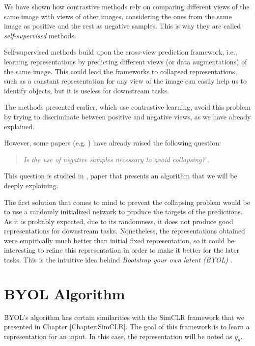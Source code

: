 \label{Chapter:BYOL}


We have shown how contrastive methods rely on comparing different views of the same image with views of other images, considering the ones from the same image as positive and the rest as negative samples. This is why they are called \emph{self-supervised} methods.

Self-supervised methods build upon the cross-view prediction framework, i.e., learning representations by predicting different views (or data augmentations) of the same image. This could lead the frameworks to collapsed representations, such as a constant representation for any view of the image can easily help us to identify objects, but it is useless for downstream tasks.

The methods presented earlier, which use contrastive learning, avoid this problem by trying to discriminate between positive and negative views, as we have already explained.

However, some papers (e.g. \cite{caron2019deep}) have already raised the following question:

\begin{quote}
    \centering
\emph{ Is the use of negative samples necessary to avoid collapsing? }. 
\end{quote}
This question is studied in \cite{grill2020bootstrap}, paper that presents an algorithm that we will be deeply explaining.

The first solution that comes to mind to prevent the collapsing problem would be to use a randomly initialized network to produce the targets of the predictions. As it is probably expected, due to its randomness, it does not produce good representations for downstream tasks. Nonetheless, the representations obtained were empirically much better than initial fixed representation, so it could be interesting to refine this representation in order to make it better for the later tasks. This is the intuitive idea behind \emph{Bootstrap your own latent (BYOL)} \citep{grill2020bootstrap}.

\section{BYOL Algorithm}

BYOL's algorithm has certain similarities with the SimCLR framework that we presented in Chapter \ref{Chapter:SimCLR}. The goal of this framework is to learn a representation for an input. In this case, the representation will be noted as $y_\theta$. 

